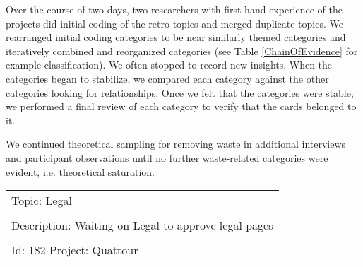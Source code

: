 Over the course of two days, two researchers with first-hand experience of the projects did initial coding of the retro topics and merged duplicate topics. We rearranged initial coding categories to be near similarly themed categories and iteratively combined and reorganized categories (see Table \ref{ChainOfEvidence} for example classification). We often stopped to record new insights. When the categories began to stabilize, we compared each category against the other categories looking for relationships. Once we felt that the categories were stable, we performed a final review of each category to verify that the cards belonged to it. 

We continued theoretical sampling for removing waste in additional interviews and participant observations until no further waste-related categories were evident, i.e. theoretical saturation. 


\begin{table}[t]
\renewcommand{\arraystretch}{1.5}
\centering
{}
\label{exampleRetroTopicl}
\begin{tabular}{|l|}
\hline
Topic: Legal \\ \\ Description: Waiting on Legal to approve legal pages \\ \\ Id: 182 Project: Quattour\\ \hline
\end{tabular}
\end{table}








